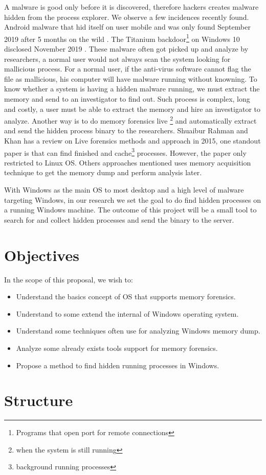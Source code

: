 A malware is good only before it is discovered, therefore hackers creates malware hidden from the process explorer. We observe a few incidences recently found. Android malware that hid itself on user mobile and was only found September 2019 after 5 months on the wild \cite{hiddenMalwareAndroid}. The Titanium backdoor\footnote{Programs that open port for remote connections} on Windows 10 disclosed November 2019 \cite{titanium}. These malware often got picked up and analyze by researchers, a normal user would not always scan the system looking for mallicious process. For a normal user, if the anti-virus software cannot flag the file as mallicious, his computer will have malware running without knowning. To know whether a system is having a hidden malware running, we must extract the memory and send to an investigator to find out. Such process is complex, long and costly, a user must be able to extract the memory and hire an investigator to analyze. Another way is to do memory forensics live \footnote{when the system is still running} and automatically extract and send the hidden process binary to the researchers. Shuaibur Rahman and Khan \cite{reviewLive} has a review on Live forensics methods and approach in 2015, one standout paper is \cite{comparativeLive} that can find finished and cache\footnote{background running processes} processes. However, the paper only restricted to Linux OS. Others approaches mentioned uses memory acquisition technique to get the memory dump and perform analysis later.

With Windows as the main OS to most desktop and a high level of malware targeting Windows, in our research we set the goal to do find hidden processes on a running Windows machine. The outcome of this project will be a small tool to search for and collect hidden processes and send the binary to the server.

\section[Objectives]{Objectives}

In the scope of this proposal, we wish to:

\begin{itemize}
  \item Understand the basics concept of OS that supports memory forensics.
  \item Understand to some extend the internal of Windows operating system.
  \item Understand some techniques often use for analyzing Windows memory dump.
  \item Analyze some already exists tools support for memory forensics.
  \item Propose a method to find hidden running processes in Windows.
\end{itemize}

\section[Structure]{Structure}

